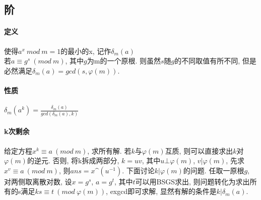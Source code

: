 \subsection{阶}

\paragraph{定义} 使得$a^x\ mod\ m=1$的最小的x, 记作$\delta_m(a)$ \\
若$a\equiv g^s\ (mod\ m)$, 其中$g$为m的一个原根. 则虽然$s$随$g$的不同取值有所不同, 但是必然满足$\delta_m(a)=gcd(s,\varphi(m))$.
\paragraph{性质} $\delta_m(a^k)=\frac{\delta_m(a)}{gcd(\delta_m(a),k)}$
\paragraph{k次剩余} 给定方程$x^k\equiv a\ (mod\ m)$, 求所有解. 若$k$与$\varphi(m)$互质, 则可以直接求出$k$对$\varphi(m)$的逆元. 否则, 将k拆成两部分, $k=uv$, 其中$u\bot \varphi(m)$, $v|\varphi(m)$, 先求$x^v\equiv a\ (mod\ m)$, 则$ans=x\^{}(u^{-1})$. 下面讨论$k|\varphi(m)$的问题. 任取一原根$g$, 对两侧取离散对数, 设$x=g^s$, $a=g^t$, 其中$t$可以用BSGS求出, 则问题转化为求出所有的s满足$ks\equiv t\ (mod\ \varphi(m))$, exgcd即可求解, 显然有解的条件是$k|\delta_m(a)$.
